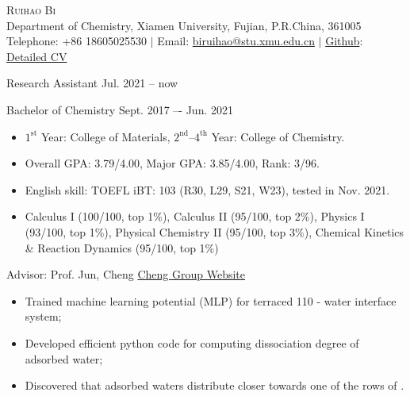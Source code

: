 \pagestyle{plain}
\thispagestyle{empty} %
\begin{center}
    \Large{\textsc{Ruihao Bi}} \\ 
    \normalsize {Department of Chemistry, Xiamen University, Fujian, P.R.China, 361005} \\ 
    Telephone: {+86 18605025530} $|$ 
    Email: {\href{mailto:biruihao@stu.xmu.edu.cn}{biruihao@stu.xmu.edu.cn}} $|$ 
    \href{https://github.com/ruihao69}{Github}: \href{https://github.com/ruihao69/brh-cv}{Detailed CV}  \\
\end{center}

\sectionrule
{}

\noindent Research Assistant \hfill {Jul. 2021 -- now}

\noindent Bachelor of Chemistry \hfill {Sept. 2017 –- Jun. 2021}

\begin{itemize}
    \item $\mathrm{1^{st}}$ Year: College of Materials, $\mathrm{2^{nd}}$--$\mathrm{4^{th}}$ Year: College of Chemistry.
    \item Overall GPA: 3.79/4.00, Major GPA: 3.85/4.00, Rank: 3/96.
    \item English skill: TOEFL iBT: 103 (R30, L29, S21, W23), tested in Nov. 2021.
\end{itemize}



\noindent{}
\begin{itemize}
    \item Calculus I (100/100, top 1\%), Calculus II (95/100, top 2\%), Physics I (93/100, top 1\%), Physical Chemistry II (95/100, top 3\%), Chemical Kinetics \& Reaction Dynamics (95/100, top 1\%)
\end{itemize}

\vspace{5mm}
\sectionrule



{\noindent Advisor: Prof. Jun, Cheng  \hfill \href{https://chengjun.xmu.edu.cn/}{Cheng Group Website}}


\begin{itemize}
    \item Trained machine learning potential (MLP) for terraced  110 - water interface system;
    \item Developed efficient python code for computing dissociation degree of adsorbed water;
    \item Discovered that  adsorbed waters distribute closer towards one of the rows of .
\end{itemize}

